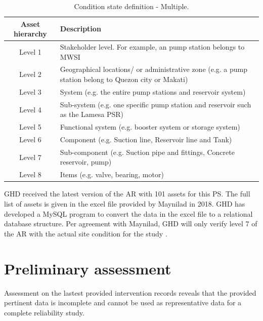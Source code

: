 \begin{table}[h]
	\caption{Condition state definition - Multiple.}
	\label{ch02_tbl_assethierachy}
	{\footnotesize
\begin{tabular}{l|p{10cm}}
	\hline
	\multicolumn{1}{c|}{Asset hierarchy} & Description \\ 
	\hline
	\multicolumn{1}{c|}{Level 1} & Stakeholder level. For example, an pump station belongs to MWSI \\ 
	\multicolumn{1}{c|}{Level 2} & Geographical locations/ or administrative zone (e.g. a pump station belong to Quezon city or Makati) \\ 
	\multicolumn{1}{c|}{Level 3} & System (e.g. the entire pump stations and reservoir system) \\ 
	\multicolumn{1}{c|}{Level 4} & Sub-system (e.g. one specific pump station and reservoir such as the Lamesa PSR) \\ 
	\multicolumn{1}{c|}{Level 5} & Functional system (e.g. booster system or storage system) \\ 
	\multicolumn{1}{c|}{Level 6} & Component (e.g. Suction line, Reservoir line and Tank) \\ 
	\multicolumn{1}{c|}{Level 7} & Sub-component (e.g. Suction pipe and fittings, Concrete reservoir, pump) \\ 
	\multicolumn{1}{c|}{Level 8} & Items (e.g. valve, bearing, motor) \\ 
	\hline
\end{tabular}		
	}
\end{table}

GHD received the latest version of the AR with 101 assets for this PS. The full list of assets is given in the excel file provided by Maynilad in 2018. GHD has developed a MySQL program to convert the data in the excel file to a relational database structure. Per agreement with Maynilad, GHD will only verify level 7 of the AR with the actual site condition for the study \cite{GHD2018m}. 
\section{Preliminary assessment}
\label{22}
Assessment on the lastest provided intervention records reveals that the provided pertinent data is incomplete and cannot be used as representative data for a complete reliability study. %

